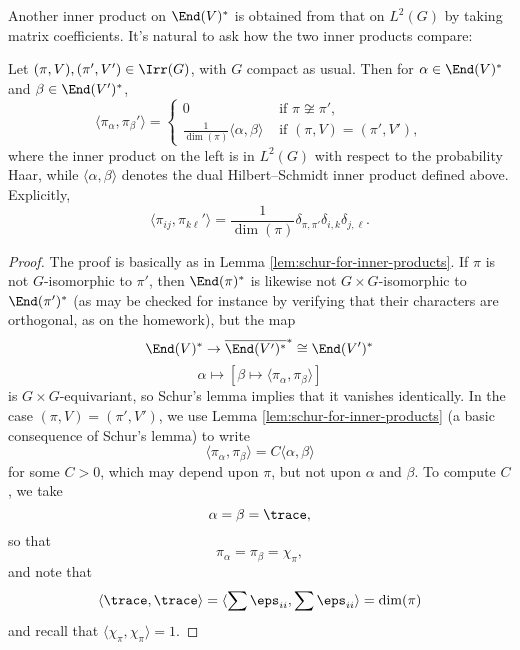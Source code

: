 \documentclass[reqno]{amsart} 
\begin{document}
Another inner product on $\End(V)^*$ is obtained from that on $L^2(G)$ by taking matrix coefficients.  It's natural to ask how the two inner products compare:
\begin{theorem}
  Let $(\pi,V), (\pi ',V') \in \Irr(G)$, with $G$ compact as usual.  Then for $\alpha \in \End(V)^*$ and $\beta \in \End(V')^*$,
  \begin{equation}\label{eq:}
    \langle
    \pi_{\alpha}, \pi_{\beta }'
    \rangle
    = 
\begin{cases}
      0 &  \text{ if } \pi \not\cong \pi ', \\
      \frac{1}{\dim(\pi)} \langle \alpha, \beta  \rangle
      & \text{ if } (\pi,V) = (\pi ', V'),
    \end{cases}
  \end{equation}
  where the inner product on the left is in $L^2(G)$ with respect to the probability Haar, while $\langle \alpha, \beta \rangle$ denotes the dual Hilbert--Schmidt inner product defined above.  Explicitly,
  \begin{equation}
    \langle \pi_{i j}, \pi_{k \ell}' \rangle
    = \frac{1}{\dim(\pi)}
    \delta_{\pi, \pi'}
    \delta_{i, k} \delta_{j, \ell}.
  \end{equation}
\end{theorem}
\begin{proof}
  The proof is basically as in Lemma \ref{lem:schur-for-inner-products}.  If $\pi$ is not $G$-isomorphic to $\pi '$, then $\End(\pi)^*$ is likewise not $G \times G$-isomorphic to $\End(\pi ')^*$ (as may be checked for instance by verifying that their characters are orthogonal, as on the homework), but the map
  \begin{equation*}
    \End(V)^* \rightarrow \overline{\End(V')^*}^* \cong \End(V')^*
  \end{equation*}
  \begin{equation*}
    \alpha \mapsto [\beta \mapsto \langle \pi_\alpha, \pi_\beta \rangle]
  \end{equation*}
  is $G \times G$-equivariant, so Schur's lemma implies that it vanishes identically.  In the case $(\pi, V) = (\pi ', V')$, we use Lemma \ref{lem:schur-for-inner-products} (a basic consequence of Schur's lemma) to write
  \begin{equation*}
    \langle \pi_\alpha, \pi _\beta \rangle = C \langle \alpha, \beta \rangle
  \end{equation*}
  for some $C > 0$, which may depend upon $\pi$, but not upon $\alpha$ and $\beta$.  To compute $C$, we take
  \begin{equation*}
    \alpha = \beta = \trace,
  \end{equation*}
  so that
  \begin{equation*}
    \pi_\alpha = \pi_\beta = \chi_\pi,
  \end{equation*}
  and note that
  \begin{equation*}
    \langle \trace, \trace \rangle = \langle \sum \eps_{i i}, \sum \eps_{i i} \rangle = \dim(\pi)
  \end{equation*}
  and recall that $\langle \chi_\pi, \chi_\pi \rangle = 1$.
\end{proof}
\end{document}

